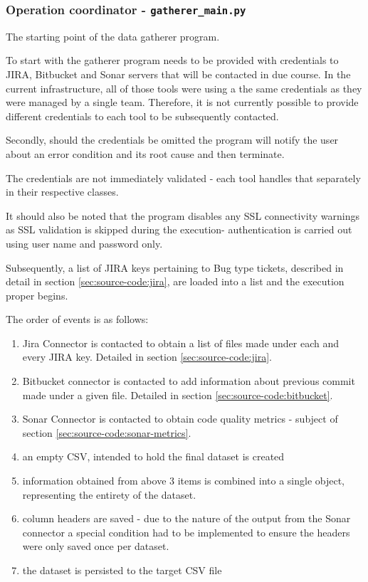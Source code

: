 \subsubsection{Operation coordinator - \texttt{gatherer\_main.py}}\label{sec:source-code:main-gatherer}
The starting point of the data gatherer program.

To start with the gatherer program needs to be provided with credentials to JIRA, Bitbucket and Sonar servers that will be contacted in due course. In the current infrastructure, all of those tools were using a the same credentials as they were managed by a single team. Therefore, it is not currently possible to provide different credentials to each tool to be subsequently contacted.

Secondly, should the credentials be omitted the program will notify the user about an error condition and its root cause and then terminate.

The credentials are not immediately validated - each tool handles that separately in their respective classes.

It should also be noted that the program disables any SSL connectivity warnings as SSL validation is skipped during the execution- authentication is carried out using user name and password only.

Subsequently, a list of JIRA keys pertaining to Bug type tickets, described in detail in section \ref{sec:source-code:jira}, are loaded into a list and the execution proper begins.

The order of events is as follows:
\begin{enumerate}
    \item Jira Connector is contacted to obtain a list of files made under each and every JIRA key. Detailed in section \ref{sec:source-code:jira}.
    \item Bitbucket connector is contacted to add information about previous commit made under a given file. Detailed in section \ref{sec:source-code:bitbucket}.
    \item Sonar Connector is contacted to obtain code quality metrics - subject of section \ref{sec:source-code:sonar-metrics}.
    \item an empty CSV, intended to hold the final dataset is created
    \item information obtained from above 3 items is combined into a single object, representing the entirety of the dataset.
    \item column headers are saved - due to the nature of the output from the Sonar connector a special condition had to be implemented to ensure the headers were only saved once per dataset.
    \item the dataset is persisted to the target CSV file
\end{enumerate}

